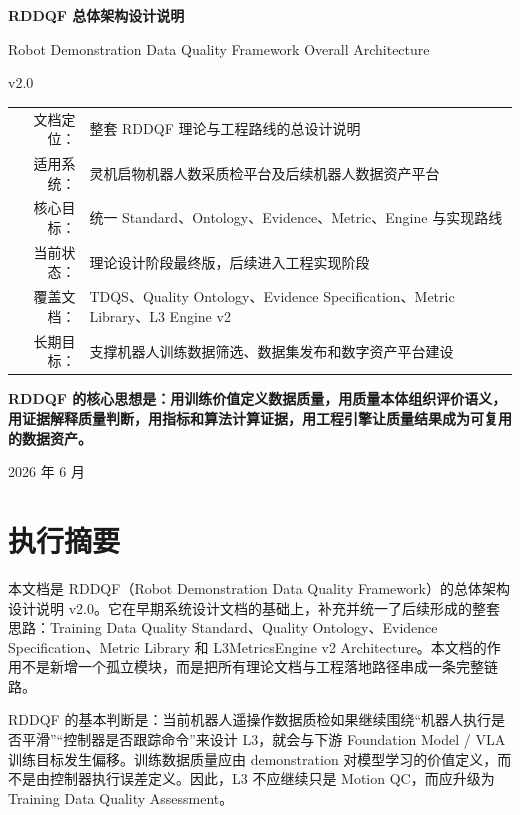\documentclass[UTF8,zihao=-4]{ctexart}
\begin{document}
\begin{titlepage}
\centering
\vspace*{2.1cm}
{\Huge\bfseries RDDQF 总体架构设计说明\par}
\vspace{0.35cm}
{\Large Robot Demonstration Data Quality Framework Overall Architecture\par}
\vspace{0.65cm}
{\LARGE v2.0\par}
\vspace{1.2cm}
\begin{tabular}{rl}
文档定位： & 整套 RDDQF 理论与工程路线的总设计说明 \\
适用系统： & 灵机启物机器人数采质检平台及后续机器人数据资产平台 \\
核心目标： & 统一 Standard、Ontology、Evidence、Metric、Engine 与实现路线 \\
当前状态： & 理论设计阶段最终版，后续进入工程实现阶段 \\
覆盖文档： & TDQS、Quality Ontology、Evidence Specification、Metric Library、L3 Engine v2 \\
长期目标： & 支撑机器人训练数据筛选、数据集发布和数字资产平台建设 \\
\end{tabular}
\vfill
\begin{minipage}{0.88\linewidth}
\centering\large\bfseries
RDDQF 的核心思想是：用训练价值定义数据质量，用质量本体组织评价语义，用证据解释质量判断，用指标和算法计算证据，用工程引擎让质量结果成为可复用的数据资产。
\end{minipage}
\vfill
{\large 2026 年 6 月\par}
\end{titlepage}

\tableofcontents
\newpage

\section*{执行摘要}

本文档是 RDDQF（Robot Demonstration Data Quality Framework）的总体架构设计说明 v2.0。它在早期系统设计文档的基础上，补充并统一了后续形成的整套思路：Training Data Quality Standard、Quality Ontology、Evidence Specification、Metric Library 和 L3MetricsEngine v2 Architecture。本文档的作用不是新增一个孤立模块，而是把所有理论文档与工程落地路径串成一条完整链路。

RDDQF 的基本判断是：当前机器人遥操作数据质检如果继续围绕“机器人执行是否平滑”“控制器是否跟踪命令”来设计 L3，就会与下游 Foundation Model / VLA 训练目标发生偏移。训练数据质量应由 demonstration 对模型学习的价值定义，而不是由控制器执行误差定义。因此，L3 不应继续只是 Motion QC，而应升级为 Training Data Quality Assessment。
\end{document}
